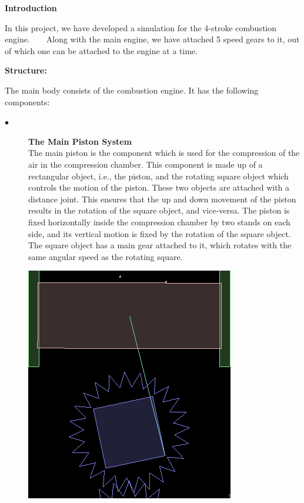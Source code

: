\documentclass[40pt]{article}
\begin{document}
\begin{center}

\huge{
\textbf{Introduction\\}}
\end{center}
\Large
{
In this project, we have developed a simulation for the 4-stroke combustion engine. ~\cite{ref1} ~\cite{ref10} Along with the main engine, we have attached 5 speed gears to it, out
of which one can be attached to the engine at a time.
\\
}
\begin{center}
\huge
{
\textbf{Structure:\\}
}
\end{center}
\Large
{
The main body consists of the combustion engine. It has the following components:
\\
\begin{description}
  \item[$\bullet$ ]\textbf{ The Main Piston System\\}
  The main piston is the component which is used for the compression of the air in the compression chamber. This component is made up of a rectangular object, i.e., the piston, and the rotating square object which controls the motion of the piston. These two objects are attached with a distance joint.
This ensures that the up and down movement of the piston results in the rotation of the square object, and vice-versa. The piston is fixed horizontally inside the compression chamber by two stands on each side, and its vertical motion is fixed by the rotation of the square object. The square object has a main gear attached to it, which rotates with the same angular speed as the rotating square.
	\begin{center}
\includegraphics[scale=0.5]{mainPiston.png}\newline

\end{center}
\end{description}}
\end{document}
